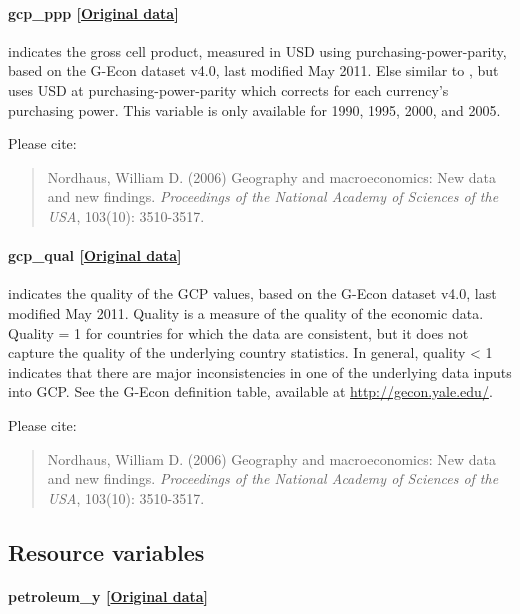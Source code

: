 \documentclass[]{book}
\begin{document}
\paragraph{gcp\_ppp {[}\href{http://gecon.yale.edu/}{Original
data}{]}}\label{gcp-ppp}

indicates the gross cell product, measured in USD using
purchasing-power-parity, based on the G-Econ dataset v4.0, last modified
May 2011. Else similar to , but uses USD at
purchasing-power-parity which corrects for each currency's purchasing
power. This variable is only available for 1990, 1995, 2000, and 2005.

Please cite:

\begin{quote}
Nordhaus, William D. (2006) Geography and macroeconomics: New data and
new findings. \emph{Proceedings of the National Academy of Sciences of
the USA}, 103(10): 3510-3517.
\end{quote}

\paragraph{gcp\_qual {[}\href{http://gecon.yale.edu/}{Original
data}{]}}\label{gcp-qual}

indicates the quality of the GCP values, based on the G-Econ dataset
v4.0, last modified May 2011. Quality is a measure of the quality of the
economic data. Quality = 1 for countries for which the data are
consistent, but it does not capture the quality of the underlying
country statistics. In general, quality \textless{} 1 indicates that
there are major inconsistencies in one of the underlying data inputs
into GCP. See the G-Econ definition table, available at
\url{http://gecon.yale.edu/}.

Please cite:

\begin{quote}
Nordhaus, William D. (2006) Geography and macroeconomics: New data and
new findings. \emph{Proceedings of the National Academy of Sciences of
the USA}, 103(10): 3510-3517.
\end{quote}

\subsection{Resource variables}\label{resource-variables-1}

\paragraph{petroleum\_y
{[}\href{https://www.prio.org/Data/Geographical-and-Resource-Datasets/Petroleum-Dataset/Petroleum-Dataset-v-12/}{Original
data}{]}}\label{petroleum-y}
\end{document}
